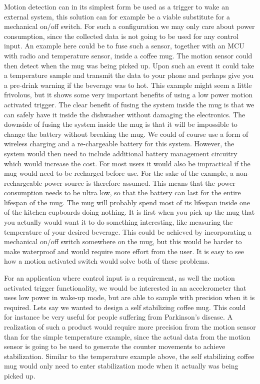 Motion detection can in its simplest form be used as a trigger to wake an external system, this solution can for example be a viable substitute for a mechanical on/off switch. For such a configuration we may only care about power consumption, since the collected data is not going to be used for any control input. An example here could be to fuse such a sensor, together with an MCU with radio and temperature sensor, inside a coffee mug. The motion sensor could then detect when the mug was being picked up. Upon such an event it could take a temperature sample and transmit the data to your phone and perhaps give you a pre-drink warning if the beverage was to hot. This example might seem a little frivolous, but it shows some very important benefits of using a low power motion activated trigger. The clear benefit of fusing the system inside the mug is that we can safely have it inside the dishwasher without damaging the electronics. The downside of fusing the system inside the mug is that it will be impossible to change the battery without breaking the mug. We could of course use a form of wireless charging and a re-chargeable battery for this system. However, the system would then need to include additional battery management circuitry which would increase the cost. For most users it would also be impractical if the mug would need to be recharged before use. For the sake of the example, a non-rechargeable power source is therefore assumed. This means that the power consumption needs to be ultra low, so that the battery can last for the entire lifespan of the mug. The mug will probably spend most of its lifespan inside one of the kitchen cupboards doing nothing. It is first when you pick up the mug that you actually would want it to do something interesting, like measuring the temperature of your desired beverage. This could be achieved by incorporating a mechanical on/off switch somewhere on the mug, but this would be harder to make waterproof and would require more effort from the user. It is easy to see how a motion activated switch would solve both of these problems. 

For an application where control input is a requirement, as well the motion activated trigger functionality, we would be interested in an accelerometer that uses low power in wake-up mode, but are able to sample with precision when it is required. Lets say we wanted to design a self stabilizing coffee mug. This could for instance be very useful for people suffering from Parkinson's disease. A realization of such a product would require more precision from the motion sensor than for the simple temperature example, since the actual data from the motion sensor is going to be used to generate the counter movements to achieve stabilization. Similar to the temperature example above, the self stabilizing coffee mug would only need to enter stabilization mode when it actually was being picked up.

